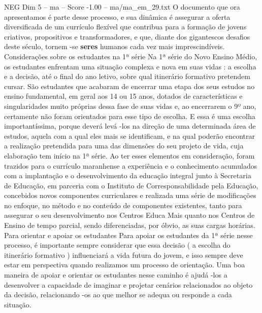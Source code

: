 \begin{textsample}{NEG Dim 5 – ma – Score -1.00 – ma/ma\_em\_29.txt}
O documento que ora apresentamos é parte desse processo, e sua dinâmica é assegurar a oferta diversificada de um currículo flexível que contribua para a formação de jovens criativos, propositivos e transformadores, e que, diante dos gigantescos desafios deste século, tornem -se \textbf{seres} humanos cada vez mais imprescindíveis.
Considerações sobre os estudantes na 1ª série Na 1ª série do Novo Ensino Médio, os estudantes enfrentam uma situação complexa e nova em suas vidas : a escolha e a decisão, até o final do ano letivo, sobre qual itinerário formativo pretendem cursar.
São estudantes que acabaram de encerrar uma etapa dos seus estudos no ensino fundamental, em geral aos 14 ou 15 anos, dotados de características e singularidades muito próprias dessa fase de suas vidas e, ao encerrarem o 9º ano, certamente não foram orientados para esse tipo de escolha.
E essa é uma escolha importantíssima, porque deverá levá -los na direção de uma determinada área de estudos, aquela com a qual eles mais se identificam, e na qual poderão encontrar a realização pretendida para uma das dimensões do seu projeto de vida, cuja elaboração tem início na 1ª série.
Ao ter esses elementos em consideração, foram trazidos para o currículo maranhense a experiência e o conhecimento acumulados com a implantação e o desenvolvimento da educação integral junto à Secretaria de Educação, em parceria com o Instituto de Corresponsabilidade pela Educação, concebidos novos componentes curriculares e realizada uma série de modificações no enfoque, no método e no conteúdo de componentes existentes, tanto para assegurar o seu desenvolvimento nos Centros Educa Mais quanto nos Centros de Ensino de tempo parcial, sendo diferenciadas, por óbvio, as suas cargas horárias.
Para orientar e apoiar os estudantes Para apoiar os estudantes da 1ª série nesse processo, é importante sempre considerar que essa decisão ( a escolha do itinerário formativo ) influenciará a vida futura do jovem, e isso sempre deve estar em perspectiva quando realizamos um processo de orientação.
Uma boa maneira de apoiar e orientar os estudantes nesse caminho é ajudá -los a desenvolver a capacidade de imaginar e projetar cenários relacionados ao objeto da decisão, relacionando -os ao que melhor se adequa ou responde a cada situação.

\end{textsample}
